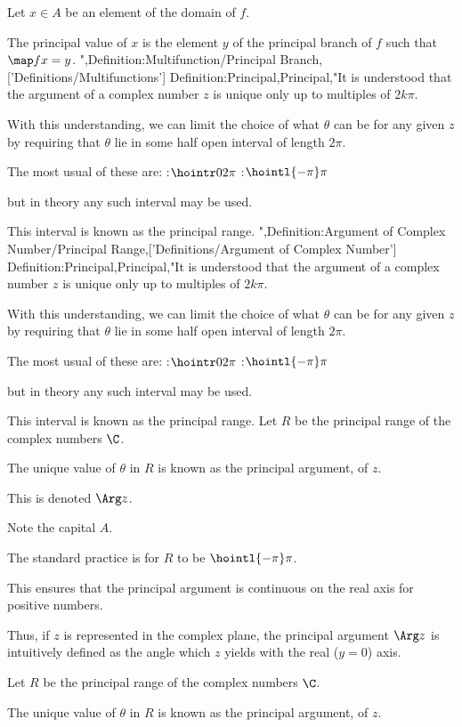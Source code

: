 Let $x \in A$ be an element of the domain of $f$.

The principal value of $x$ is the element $y$ of the principal branch of $f$ such that $\map f x = y$.
",Definition:Multifunction/Principal Branch,['Definitions/Multifunctions']
Definition:Principal,Principal,"It is understood that the argument of a complex number $z$ is unique only up to multiples of $2 k \pi$.

With this understanding, we can limit the choice of what $\theta$ can be for any given $z$ by requiring that $\theta$ lie in some half open interval of length $2 \pi$.

The most usual of these are:
:$\hointr 0 {2 \pi}$
:$\hointl {-\pi} \pi$

but in theory any such interval may be used.

This interval is known as the principal range.
",Definition:Argument of Complex Number/Principal Range,['Definitions/Argument of Complex Number']
Definition:Principal,Principal,"It is understood that the argument of a complex number $z$ is unique only up to multiples of $2 k \pi$.

With this understanding, we can limit the choice of what $\theta$ can be for any given $z$ by requiring that $\theta$ lie in some half open interval of length $2 \pi$.

The most usual of these are:
:$\hointr 0 {2 \pi}$
:$\hointl {-\pi} \pi$

but in theory any such interval may be used.

This interval is known as the principal range.
Let $R$ be the principal range of the complex numbers $\C$.

The unique value of $\theta$ in $R$ is known as the principal argument, of $z$.

This is denoted $\Arg z$.

Note the capital $A$.

The standard practice is for $R$ to be $\hointl {-\pi} \pi$.

This ensures that the principal argument is continuous on the real axis for positive numbers.

Thus, if $z$ is represented in the complex plane, the principal argument $\Arg z$ is intuitively defined as the angle which $z$ yields with the real ($y = 0$) axis.



Let $R$ be the principal range of the complex numbers $\C$.

The unique value of $\theta$ in $R$ is known as the principal argument, of $z$.

